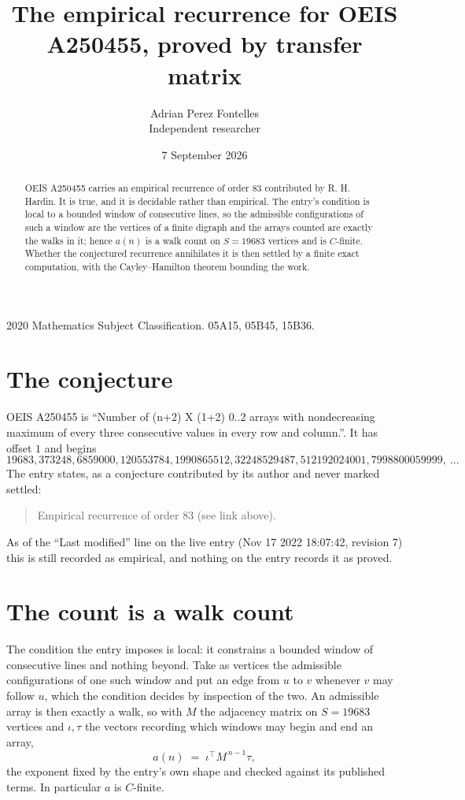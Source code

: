 \documentclass[11pt,a4paper]{article}
\title{The empirical recurrence for OEIS A250455, proved by transfer matrix}
\author{Adrian Perez Fontelles\\ \small Independent researcher}
\date{7 September 2026}
\theoremstyle{plain}
\theoremstyle{definition}
\begin{document}
\maketitle

\begin{abstract}
OEIS A250455 carries an empirical recurrence of order $83$ contributed by R. H. Hardin. It is
true, and it is decidable rather than empirical. The entry's condition is local to a bounded window of consecutive lines, so
the admissible configurations of such a window are the vertices of a finite digraph and the
arrays counted are exactly the walks in it; hence $a(n)$ is a walk count on $S=19683$ vertices
and is $C$-finite. Whether the conjectured recurrence annihilates it is then settled by a
finite exact computation, with the Cayley--Hamilton theorem bounding the work.
\end{abstract}

\noindent\small 2020 Mathematics Subject Classification. 05A15, 05B45, 15B36.\normalsize

\section{The conjecture}

OEIS A250455 is ``Number of (n+2) X (1+2) 0..2 arrays with nondecreasing maximum of every three consecutive values in every row and column.''. It has offset $1$ and begins
\[
19683, 373248, 6859000, 120553784, 1990865512, 32248529487, 512192024001, 7998800059999,\ \dots
\]
The entry states, as a conjecture contributed by its author and never marked settled:
\begin{quote}
Empirical recurrence of order 83 (see link above).
\end{quote}
As of the ``Last modified'' line on the live entry (Nov 17 2022 18:07:42, revision 7) this is still
recorded as empirical, and nothing on the entry records it as proved.

\section{The count is a walk count}

The condition the entry imposes is local: it constrains a bounded window of consecutive lines and nothing beyond. Take as
vertices the admissible configurations of one such window and put an edge from $u$ to $v$
whenever $v$ may follow $u$, which the condition decides by inspection of the two. An
admissible array is then exactly a walk, so with $M$ the adjacency matrix on $S=19683$ vertices
and $\iota,\tau$ the vectors recording which windows may begin and end an array,
\[
a(n)\;=\;\iota^{\!\top}M^{\,n-1}\tau ,
\]
the exponent fixed by the entry's own shape and checked against its published terms. In
particular $a$ is $C$-finite.
\end{document}
